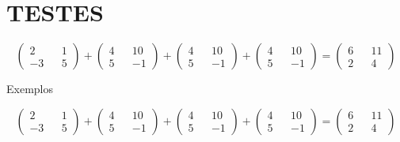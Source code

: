 {%
\paraAlunos

\section{TESTES}

\lipsum[1]




\begin{caixaExemplo}

\lipsum[1]

$$\begin{pmatrix} 2 && 1 \\ -3 && 5 \end{pmatrix} + \begin{pmatrix} 4 && 10 \\ 5 && -1 \end{pmatrix} + \begin{pmatrix} 4 && 10 \\ 5 && -1 \end{pmatrix} + \begin{pmatrix} 4 && 10 \\ 5 && -1 \end{pmatrix} = \begin{pmatrix} 6 && 11 \\ 2 && 4  \end{pmatrix}$$


\end{caixaExemplo}

\begin{caixaExemplo}
Exemplos

$$\begin{pmatrix} 2 && 1 \\ -3 && 5 \end{pmatrix} + \begin{pmatrix} 4 && 10 \\ 5 && -1 \end{pmatrix} + \begin{pmatrix} 4 && 10 \\ 5 && -1 \end{pmatrix} + \begin{pmatrix} 4 && 10 \\ 5 && -1 \end{pmatrix} = \begin{pmatrix} 6 && 11 \\ 2 && 4  \end{pmatrix}$$


\end{caixaExemplo}

}
